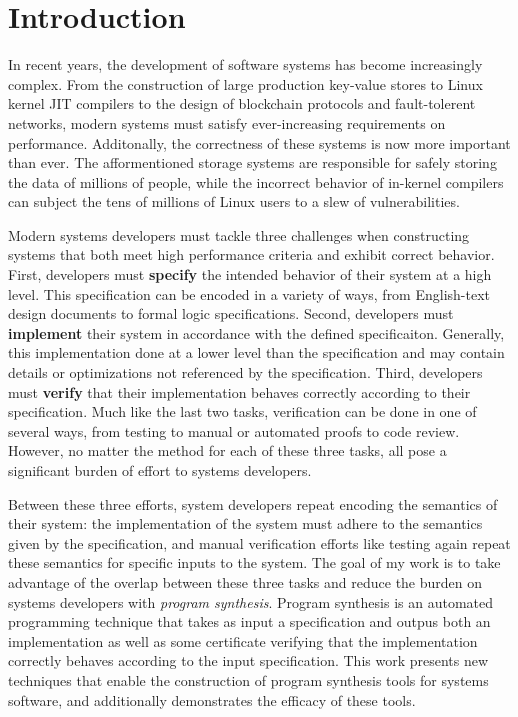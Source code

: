 \chapter{Introduction}

In recent years, the development of software systems has become increasingly
complex.
From the construction of large production key-value stores to Linux kernel JIT compilers
to the design of blockchain protocols and fault-tolerent networks,
modern systems must satisfy ever-increasing requirements on performance.
Additonally, the
correctness of these systems is now more important than ever. The
afformentioned storage systems are responsible for safely storing the data
of millions of people, while
the incorrect behavior of in-kernel compilers can subject the tens of millions of
Linux users to a slew of vulnerabilities.

Modern systems developers must tackle three challenges when constructing
systems that both meet high performance criteria and exhibit correct behavior.
First, developers must \textbf{specify} the intended behavior of their system at a high
level. This specification can be encoded in a variety of ways, from
English-text design documents to formal logic specifications.
Second, developers must \textbf{implement} their system in accordance with the defined
specificaiton. Generally, this implementation done at a lower level than the
specification and may contain details or optimizations not referenced by the specification.
Third, developers must \textbf{verify} that their implementation behaves correctly 
according to their specification. Much like the last two tasks, verification can be done
in one of several ways, from testing to manual or automated proofs to code review.
However, no matter the method for each of these three tasks,
all pose a significant burden of effort to systems developers.


Between these three efforts, system developers repeat encoding the semantics of
their system: the implementation of the system must adhere to the semantics
given by the specification, and manual verification efforts like testing again
repeat these semantics for specific inputs to the system.
The goal of my work is to take advantage of the overlap between these three tasks
and reduce the burden on systems developers with \textit{program synthesis}.
Program synthesis is an automated programming technique
that takes as input a specification and outpus both an implementation
as well as some certificate verifying that the implementation correctly behaves
according to the input specification.
This work presents new techniques that enable the construction of program
synthesis tools for systems software, and additionally demonstrates the
efficacy of these tools.

